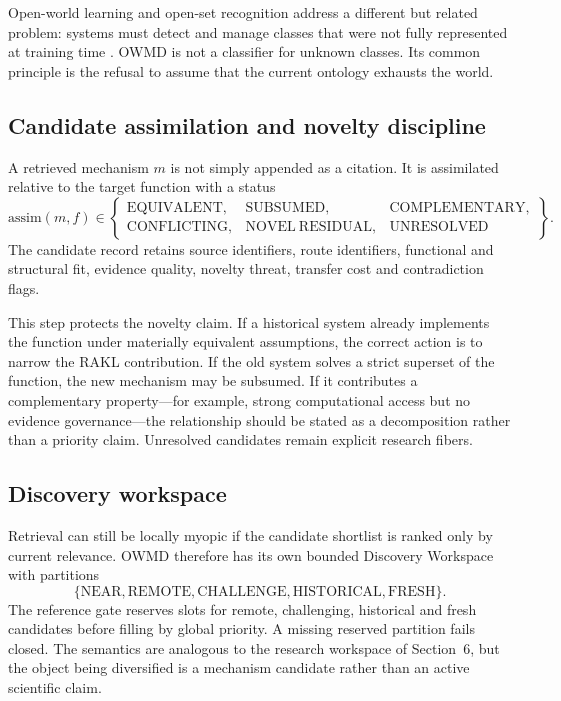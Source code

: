 Open-world learning and open-set recognition address a different but related problem: systems must detect and manage classes that were not fully represented at training time \cite{jafarzadeh2021}. OWMD is not a classifier for unknown classes. Its common principle is the refusal to assume that the current ontology exhausts the world.

\subsection{Candidate assimilation and novelty discipline}

A retrieved mechanism \(m\) is not simply appended as a citation. It is assimilated relative to the target function with a status
\[
\mathrm{assim}(m,f)\in
\left\{
\begin{array}{lll}
\mathrm{EQUIVALENT}, & \mathrm{SUBSUMED}, & \mathrm{COMPLEMENTARY},\\
\mathrm{CONFLICTING}, & \mathrm{NOVEL\ RESIDUAL}, & \mathrm{UNRESOLVED}
\end{array}
\right\}.
\]
The candidate record retains source identifiers, route identifiers, functional and structural fit, evidence quality, novelty threat, transfer cost and contradiction flags.

This step protects the novelty claim. If a historical system already implements the function under materially equivalent assumptions, the correct action is to narrow the RAKL contribution. If the old system solves a strict superset of the function, the new mechanism may be subsumed. If it contributes a complementary property---for example, strong computational access but no evidence governance---the relationship should be stated as a decomposition rather than a priority claim. Unresolved candidates remain explicit research fibers.

\subsection{Discovery workspace}

Retrieval can still be locally myopic if the candidate shortlist is ranked only by current relevance. OWMD therefore has its own bounded Discovery Workspace with partitions
\[
\{\mathrm{NEAR},\mathrm{REMOTE},\mathrm{CHALLENGE},\mathrm{HISTORICAL},\mathrm{FRESH}\}.
\]
The reference gate reserves slots for remote, challenging, historical and fresh candidates before filling by global priority. A missing reserved partition fails closed. The semantics are analogous to the research workspace of Section~6, but the object being diversified is a mechanism candidate rather than an active scientific claim.

